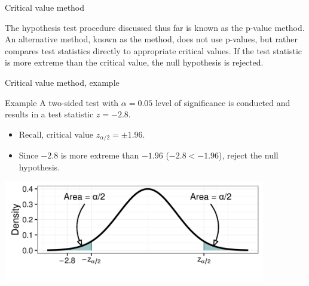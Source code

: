 \documentclass[xcolor=table]{beamer}
\begin{document}
\begin{frame}{Critical value method}
\begin{block}{}
\large
The hypothesis test procedure discussed thus far is known as the p-value method. An alternative method, known as the  method, does not use p-values, but rather compares test statistics directly to appropriate critical values. If the test statistic is more extreme than the critical value, the null hypothesis is rejected.
\end{block}
\end{frame}

\begin{frame}{Critical value method, example}
\begin{exampleblock}{Example}
\large
A two-sided test with $\alpha = 0.05$ level of significance is conducted and results in a test statistic $z= - 2.8$.
\begin{itemize}
\item Recall, critical value $z_{\alpha/2} = \pm 1.96$.
\item Since $-2.8$ is more extreme than $-1.96$ ($-2.8 < -1.96$), reject the null hypothesis.
\end{itemize} 
\end{exampleblock}

\medskip
{\centering
\includegraphics[width=4.5in]{../images/ch08_cv}
\par}

\end{frame}
\end{document}
